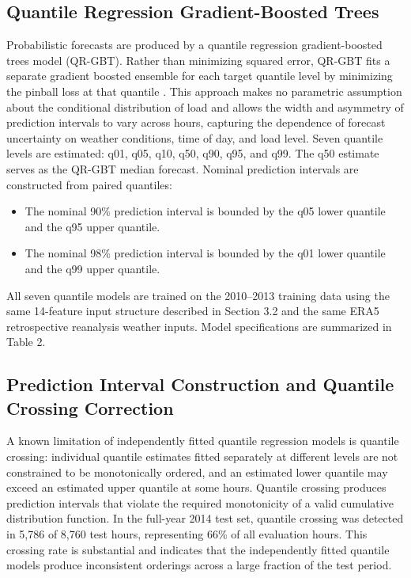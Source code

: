 \documentclass[12pt,a4paper]{article}
\begin{document}
\subsection{Quantile Regression Gradient-Boosted Trees}
Probabilistic forecasts are produced by a quantile regression gradient-boosted trees model (QR-GBT). Rather than minimizing squared error, QR-GBT fits a separate gradient boosted ensemble for each target quantile level by minimizing the pinball loss at that quantile \cite{koenker1978regression,friedman2001greedy}. This approach makes no parametric assumption about the conditional distribution of load and allows the width and asymmetry of prediction intervals to vary across hours, capturing the dependence of forecast uncertainty on weather conditions, time of day, and load level.
Seven quantile levels are estimated: q01, q05, q10, q50, q90, q95, and q99. The q50 estimate serves as the QR-GBT median forecast. Nominal prediction intervals are constructed from paired quantiles:


\begin{itemize}[leftmargin=*, itemsep=2pt]
    \item The nominal 90\% prediction interval is bounded by the q05 lower quantile and the q95 upper quantile.
    \item The nominal 98\% prediction interval is bounded by the q01 lower quantile and the q99 upper quantile.
\end{itemize}


All seven quantile models are trained on the 2010–2013 training data using the same 14-feature input structure described in Section 3.2 and the same ERA5 retrospective reanalysis weather inputs. Model specifications are summarized in Table 2.
\subsection{Prediction Interval Construction and Quantile Crossing Correction}
A known limitation of independently fitted quantile regression models is quantile crossing: individual quantile estimates fitted separately at different levels are not constrained to be monotonically ordered, and an estimated lower quantile may exceed an estimated upper quantile at some hours. Quantile crossing produces prediction intervals that violate the required monotonicity of a valid cumulative distribution function.
In the full-year 2014 test set, quantile crossing was detected in 5,786 of 8,760 test hours, representing 66\% of all evaluation hours. This crossing rate is substantial and indicates that the independently fitted quantile models produce inconsistent orderings across a large fraction of the test period.
\end{document}
